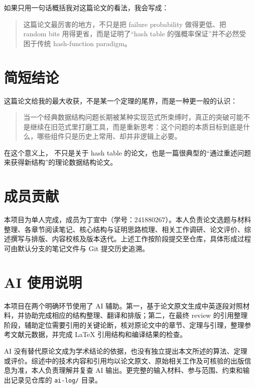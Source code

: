 \documentclass[12pt]{article}
\begin{document}
如果只用一句话概括我对这篇论文的看法，我会写成：

\begin{quote}这篇论文最厉害的地方，不只是把 failure probability 做得更低、把 random bits 用得更省，而是证明了“hash table 的强概率保证”并不必然受困于传统 hash-function paradigm。\end{quote}

\section{简短结论}

这篇论文给我的最大收获，不是某一个定理的尾界，而是一种更一般的认识：

\begin{quote}当一个经典数据结构问题长期被某种实现范式所束缚时，真正的突破可能不是继续在旧范式里打磨工具，而是重新思考：这个问题的本质目标到底是什么，哪些组件只是历史上常用、却并非逻辑上必要。\end{quote}

在这个意义上，\texttt{} 不只是关于 hash table 的论文，也是一篇很典型的“通过重述问题来获得新结构”的理论数据结构论文。

\section{成员贡献}

本项目为单人完成，成员为丁宣中（学号：241880267）。本人负责论文选题与材料整理、各章节阅读笔记、核心结构与证明思路梳理、相关工作调研、论文评价、综述撰写与排版、内容校核及版本迭代。上述工作按阶段提交至仓库，具体形成过程可由默认分支的笔记文件与 Git 提交历史追溯。

\section{AI 使用说明}

本项目在两个明确环节使用了 AI 辅助。第一，基于论文原文生成中英逐段对照材料，并协助完成相应的结构整理、翻译和排版；第二，在最终 review 的引用整理阶段，辅助定位需要引用的关键论断，核对原论文中的章节、定理与引理，整理参考文献元数据，并完成 LaTeX 引用结构和编译结果的检查。

AI 没有替代原论文成为学术结论的依据，也没有独立提出本文所述的算法、定理或评价。综述中的技术内容和引用均以论文原文、原始相关工作及可核验的出版信息为准，本人负责理解并复查 AI 输出。更完整的输入材料、参与范围、约束和输出记录见仓库的 \texttt{ai-log/} 目录。
\end{document}
